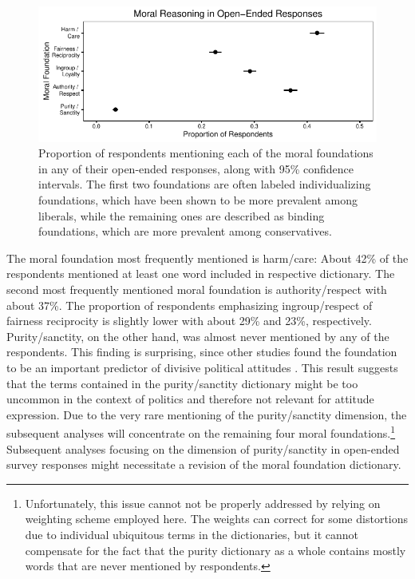 \documentclass[12pt]{article}
\begin{document}
\begin{figure}[ht]\centering
\includegraphics{../calc/fig/prop_mft.pdf}
\caption{Proportion of respondents mentioning each of the moral foundations in any of their open-ended responses, along with 95\% confidence intervals. The first two foundations are often labeled individualizing foundations, which have been shown to be more prevalent among liberals, while the remaining ones are described as binding foundations, which are more prevalent among conservatives.}\label{fig:prop_ideol}
\end{figure}

The moral foundation most frequently mentioned is harm/care: About 42\% of the respondents mentioned at least one word included in respective dictionary. The second most frequently mentioned moral foundation is authority/respect with about 37\%. The proportion of respondents emphasizing ingroup/respect of fairness reciprocity is slightly lower with about 29\% and 23\%, respectively. Purity/sanctity, on the other hand, was almost never mentioned by any of the respondents. This finding is surprising, since other studies found the foundation to be an important predictor of divisive political attitudes \citep{koleva2012tracing}. This result suggests that the terms contained in the purity/sanctity dictionary might be too uncommon in the context of politics and therefore not relevant for attitude expression. Due to the very rare mentioning of the purity/sanctity dimension, the subsequent analyses will concentrate on the remaining four moral foundations.\footnote{Unfortunately, this issue cannot not be properly addressed by relying on weighting scheme employed here. The weights can correct for some distortions due to individual ubiquitous terms in the dictionaries, but it cannot compensate for the fact that the purity dictionary as a whole contains mostly words that are never mentioned by respondents.} Subsequent analyses focusing on the dimension of purity/sanctity in open-ended survey responses might necessitate a revision of the moral foundation dictionary.
\end{document}

